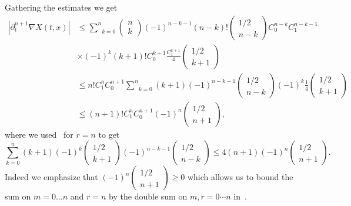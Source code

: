 \documentclass[AHL,Unicode,longabstracts,published]{cedram}
\renewcommand{\leq}{\leqslant}
\renewcommand{\geq}{\geqslant}
\begin{document}
Gathering the estimates we get
\begingroup
\allowdisplaybreaks
\begin{align*}
\left|\partial_t^{n+1} \nabla X(t,x)\right|&\leq \underset{k=0}{\overset{n}{\sum}}
\begin{pmatrix}n \\k
\end{pmatrix} (-1)^{n-k-1}(n-k)!
\begin{pmatrix}1/2 \\n-k
\end{pmatrix}C_0^{n-k}C_1^{n-k-1} \\
&\times (-1)^k(k+1)!C_0^{k+1}\frac{C_1^{k+1}}{4}
\begin{pmatrix}1/2 \\k+1
\end{pmatrix} \\
&\leq n! C_1^{n} C_0^{n+1}\underset{k=0}{\overset{n}{\sum}} (k+1) (-1)^{n-k-1}
\begin{pmatrix}1/2 \\n-k
\end{pmatrix} (-1)^k\frac{1}{4}
\begin{pmatrix}1/2 \\k+1
\end{pmatrix} \\
&\leq (n+1)! C_1^{n} C_0^{n+1}(-1)^n
\begin{pmatrix}1/2 \\n+1
\end{pmatrix},
\end{align*}
\endgroup
where we used~\cite[Lemma~4.2]{CVW} for $r=n$ to get
\begin{equation}\label{formule_magique2}
\underset{k=0}{\overset{n}{\sum}} (k+1) (-1)^k
\begin{pmatrix}1/2 \\k+1
\end{pmatrix} (-1)^{n-k-1}
\begin{pmatrix}1/2 \\n-k
\end{pmatrix} \leq 4(n+1)(-1)^n
\begin{pmatrix}1/2 \\n+1
\end{pmatrix}.
\end{equation}
Indeed we emphasize that $(-1)^n
(\begin{smallmatrix}1/2 \\n+1
\end{smallmatrix})\geq 0 $ which allows us to bound the sum on $m=0 \dots n$ and $r=n$ by the double sum on $m,r=0 \cdots n$ in~\cite[Lemma~4.2]{CVW}.
\end{document}
